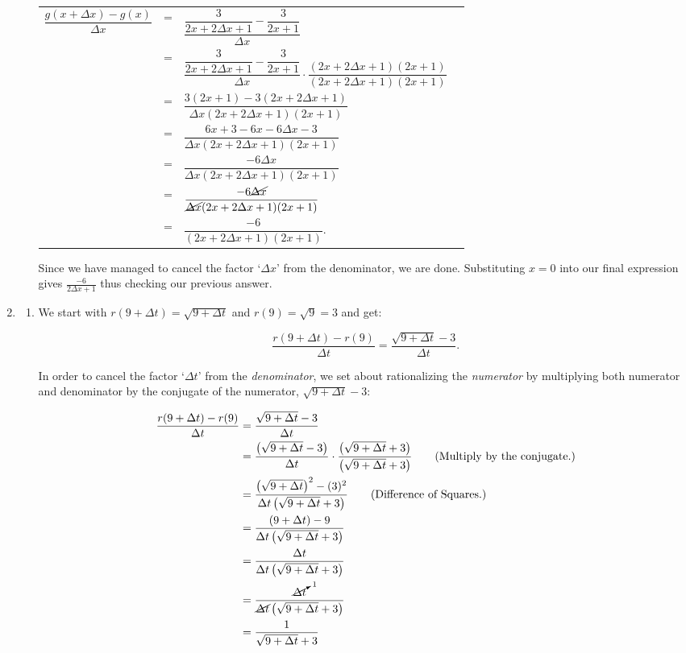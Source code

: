 \begin{ex}
\begin{enumerate}
\begin{enumerate}
\begin{longtable}{rclr}
$\dfrac{g(x+\Delta x)-g(x)}{\Delta x}$ & = & $\dfrac{\dfrac{3}{2x+2\Delta x+1}-\dfrac{3}{2x+1}}{\Delta x}$ & \\ [10pt]
& = &  $\dfrac{\dfrac{3}{2x+2\Delta x+1}-\dfrac{3}{2x+1}}{\Delta x} \cdot \dfrac{(2x+2\Delta x+1)(2x+1)}{(2x+2\Delta x+1)(2x+1)}$ & \\ [10pt]
& = &  $\dfrac{3(2x+1)-3(2x+2\Delta x+1)}{\Delta x(2x+2\Delta x+1)(2x+1)}$  & \\ [10pt]
& = &  $\dfrac{6x+3-6x-6\Delta x-3}{\Delta x(2x+2\Delta x+1)(2x+1)}$  & \\ [10pt]
& = &  $\dfrac{-6\Delta x}{\Delta x(2x+2\Delta x+1)(2x+1)}$  & \\ [10pt]
& = &  $\dfrac{-6\cancel{\Delta x}}{\cancel{\Delta x}(2x+2\Delta x+1)(2x+1)}$  & \\ [10pt]
& = &  $\dfrac{-6}{(2x+2\Delta x+1)(2x+1)}$.  & \\ 

\end{longtable}

Since we have managed to cancel the factor `$\Delta x$' from the denominator, we are done.  Substituting $x=0$ into our final expression gives $\frac{-6}{2 \Delta x +1}$ thus checking our previous answer.

\end{enumerate}

\item 

\begin{enumerate}


\item We start with $r(9+\Delta t) = \sqrt{9+\Delta t}$ and $r(9) = \sqrt{9} = 3$ and get:

\[ \dfrac{r(9+\Delta t)-r(9)}{\Delta t} = \dfrac{\sqrt{9+\Delta t} - 3}{\Delta t}.\]


In order to cancel the factor `$\Delta t$' from the \textit{denominator}, we set about rationalizing the \textit{numerator} by multiplying both numerator and denominator by the conjugate of the numerator, $\sqrt{9+\Delta t} - 3$:

\begin{align*}
\dfrac{r(9+\Delta t) - r(9)}{\Delta t} & = \dfrac{\sqrt{9+\Delta t} - 3}{\Delta t} \\
& = \dfrac{\left(\sqrt{9+\Delta t} - 3 \right)}{\Delta t} \cdot \dfrac{\left(\sqrt{9+\Delta t} + 3\right)}{\left(\sqrt{9+\Delta t} + 3\right)} \tag{Multiply by the conjugate.} \\
& = \dfrac{\left(\sqrt{9+\Delta t}\right)^2 -(3)^2}{\Delta t\left(\sqrt{9+\Delta t} + 3\right)} \tag{Difference of Squares.}\\
& = \dfrac{(9+\Delta t) - 9}{\Delta t\left(\sqrt{9+\Delta t} + 3\right)} \\
& = \dfrac{\Delta t}{\Delta t\left(\sqrt{9+\Delta t} + 3\right)} \\
& = \dfrac{\cancelto{1}{\Delta t}}{\cancel{\Delta t}\left(\sqrt{9+\Delta t} + 3\right)} \\
& = \dfrac{1}{\sqrt{9+\Delta t} +3} \\ 
\end{align*}


\end{enumerate}
\end{enumerate}
\end{ex}
